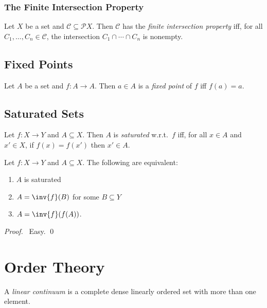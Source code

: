 \subsection{The Finite Intersection Property}

\begin{df}
  Let $X$ be a set and $\mathcal{C} \subseteq \mathcal{P} X$. Then $\mathcal{C}$ has the \emph{finite intersection property} iff, for all $C_1, \ldots, C_n \in \mathcal{C}$, the intersection $C_1 \cap \cdots \cap C_n$ is nonempty.
\end{df}

\section{Fixed Points}

\begin{df}
  Let $A$ be a set and $f : A \rightarrow A$. Then $a \in A$ is a \emph{fixed point} of $f$ iff $f(a) = a$.
\end{df}

\section{Saturated Sets}

\begin{df}
  Let $f : X \rightarrow Y$ and $A \subseteq X$. Then $A$ is \emph{saturated} w.r.t.~$f$ iff, for all $x \in A$ and $x' \in X$, if $f(x) = f(x')$ then $x' \in A$.
\end{df}

\begin{prop}
  Let $f : X \rightarrow Y$ and $A \subseteq X$. The following are equivalent:
  \begin{enumerate}
    \item $A$ is saturated
    \item $A = \inv{f}(B)$ for some $B \subseteq Y$
    \item $A = \inv{f}(f(A))$.
  \end{enumerate}
\end{prop}

\begin{proof}
  \pf\ Easy. \qed
\end{proof}

\chapter{Order Theory}

\begin{df}
  A \emph{linear continuum} is a complete dense linearly ordered set with more than one element.
\end{df}
